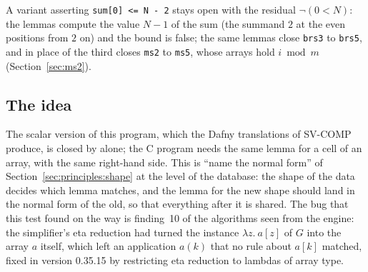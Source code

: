A variant asserting \texttt{sum[0] <= N - 2} stays open with the residual $\neg(0 < N)$: the lemmas compute
the value $N - 1$ of the sum (the summand $2$ at the even positions from $2$ on) and the bound is false; the
same lemmas close \texttt{brs3} to \texttt{brs5}, and  in place of the third closes
\texttt{ms2} to \texttt{ms5}, whose arrays hold $i \bmod m$ (Section~\ref{sec:ms2}).

\subsection{The idea}
The scalar version of this program, which the Dafny translations of SV-COMP produce, is closed by
 alone; the C program needs the same lemma for a cell of an array, with
the same right-hand side. This is ``name the normal form'' of Section~\ref{sec:principles:shape} at the level
of the database: the shape of the data decides which lemma matches, and the lemma for the new shape
should land in the normal form of the old, so that everything after it is shared. The bug that this test
found on the way is finding~10 of the algorithms seen from the engine: the simplifier's eta reduction had
turned the instance $\lambda z.\ a[z]$ of $G$ into the array $a$ itself, which left an application $a(k)$
that no rule about $a[k]$ matched, fixed in version 0.35.15 by restricting eta reduction to lambdas of
array type.
